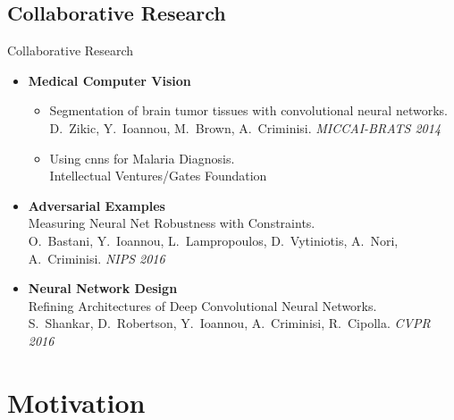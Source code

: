 \documentclass[t,xcolor=dvipsnames]{beamer}
\begin{document}
\subsection{Collaborative Research}
\begin{frame}{Collaborative Research}
\begin{itemize}
    \item \textbf{Medical Computer Vision}
    \begin{itemize}
        \item Segmentation of brain tumor tissues with convolutional neural networks.\\{\footnotesize D.\ Zikic, Y.\ Ioannou, M.\ Brown, A.\ Criminisi. \textit{MICCAI-BRATS 2014}}
        \item Using \glspl{cnn} for Malaria Diagnosis.\\{\footnotesize Intellectual Ventures/Gates Foundation}
    \end{itemize}
    \item \textbf{Adversarial Examples}\\Measuring Neural Net Robustness with Constraints.\\{\footnotesize O.\ Bastani, Y.\ Ioannou, L.\ Lampropoulos, D.\ Vytiniotis, A.\ Nori, A.\ Criminisi. \textit{NIPS 2016}}
    \item \textbf{Neural Network Design}\\Refining Architectures of Deep Convolutional Neural Networks.\\{\footnotesize 
S.\ Shankar, D.\ Robertson, Y.\ Ioannou, A.\ Criminisi, R.\ Cipolla. \textit{CVPR 2016}}
\end{itemize}
\end{frame}

\section{Motivation}

\end{document}
